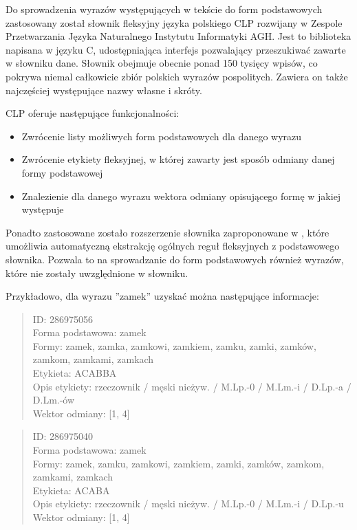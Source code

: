 \documentclass[11pt,a4paper]{article}
\begin{document}
Do sprowadzenia wyrazów występujących w tekście do form podstawowych
zastosowany został słownik fleksyjny języka polskiego CLP
\cite{gajecki-slownik} rozwijany w Zespole Przetwarzania Języka Naturalnego
Instytutu Informatyki AGH. Jest to biblioteka napisana w języku C,
udostępniająca interfejs pozwalający przeszukiwać zawarte w słowniku dane.
Słownik obejmuje obecnie ponad 150 tysięcy wpisów, co pokrywa niemal całkowicie
zbiór polskich wyrazów pospolitych. Zawiera on także najczęściej występujące
nazwy własne i skróty.

CLP oferuje następujące funkcjonalności:
\begin{itemize}
\item Zwrócenie listy możliwych form podstawowych dla danego wyrazu
\item Zwrócenie etykiety fleksyjnej, w której zawarty jest sposób odmiany
danej formy podstawowej
\item Znalezienie dla danego wyrazu wektora odmiany opisującego formę
w jakiej występuje
\end{itemize}

Ponadto zastosowane zostało rozszerzenie słownika zaproponowane w
\cite{korzycki-stemmer}, które umożliwia automatyczną ekstrakcję ogólnych reguł
fleksyjnych z podstawowego słownika.  Pozwala to na sprowadzanie do form
podstawowych również wyrazów, które nie zostały uwzględnione w słowniku.

Przykładowo, dla wyrazu ''zamek'' uzyskać można następujące informacje:

\begin{quote}
ID: 286975056\\
Forma podstawowa: zamek\\
Formy: zamek, zamka, zamkowi, zamkiem, zamku, zamki, zamków, zamkom, zamkami,
zamkach\\
Etykieta: ACABBA\\
Opis etykiety: rzeczownik / męski nieżyw. / M.Lp.-0 / M.Lm.-i / D.Lp.-a /
D.Lm.-ów\\
Wektor odmiany: [1, 4]\\
\end{quote}

\begin{quote}
ID: 286975040\\
Forma podstawowa: zamek\\
Formy: zamek, zamku, zamkowi, zamkiem, zamki, zamków, zamkom, zamkami,
zamkach\\
Etykieta: ACABA\\
Opis etykiety: rzeczownik / męski nieżyw. / M.Lp.-0 / M.Lm.-i / D.Lp.-u\\
Wektor odmiany: [1, 4]\\
\end{quote}
\pagebreak
\end{document}
